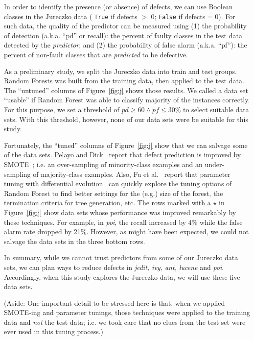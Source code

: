 \documentclass{sig-alternate}
\newcommand{\fig}[1]{Figure~\ref{fig:#1}}
\begin{document}
\begin{itemize}
In order to identify the presence (or absence) of defects, we can   use Boolean classes in the  Jureczko data ( \texttt{True} if defects $\gt$ 0; \texttt{False} if defects = 0). For such data, the quality of the predictor can be measured using (1) the  probability of detection (a.k.a. ``pd'' or recall):  the percent of faulty classes in the test data detected by the {\em predictor}; and (2) the  probability of false alarm (a.k.a. ``pf''): the percent of non-fault classes that are {\em predicted} to be defective.

As a preliminary study, we split the Jureczko  data into train and test groups. Random Forests was built from the training data, then applied to the test data. The ``untuned'' columns of \fig{j} shows those results. We called a data set ``usable'' if Random Forest was able to classify majority of the instances correctly. For this purpose, we set a threshold of $\mathit{pd}\ge 60 \wedge \mathit{pf} \le 30$\% to select suitable data sets. With this threshold, however, none of our data sets were be suitable for this study.

Fortunately, the ``tuned'' columns of \fig{j} show that we can salvage some of the data sets. Pelayo and Dick~\cite{pelayo07} report that defect prediction is improved by SMOTE~\cite{Chawla2002}; i.e. an over-sampling of minority-class examples and an under-sampling of majority-class examples. Also, Fu et al.~\cite{fu:ase15} report that parameter tuning with differential evolution~\cite{storn97} can quickly explore the tuning options of Random Forest to find better settings for the (e.g.) size of the forest, the termination criteria
for tree generation, etc. The rows \colorbox{celadon}{marked with a $\star$} in \fig{j} show data sets whose performance was improved remarkably by these techniques. For example, in {\em poi}, the recall increased by 4\% while the false alarm rate dropped by 21\%. However,  as might have been expected, we could not salvage the data sets in the  three bottom rows.

In summary, while we cannot trust predictors from some of our Jureczko data sets,
we can plan ways to reduce defects in {\em jedit, ivy, ant, lucene} and {\em poi}.
Accordingly, when this study explores the Jureczko data, we will use these five data sets.

(Aside: One important detail to be stressed here is that, when we applied    SMOTE-ing and
parameter tunings, those techniques were applied to the training data and {\em not}
the test data; i.e. we took care that no clues from the test set were ever used in this tuning process.)



\end{itemize}
\end{document}
